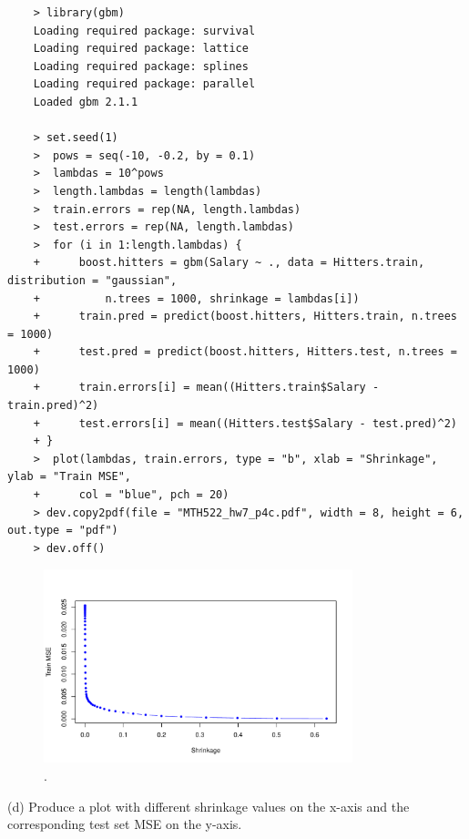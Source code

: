 \documentclass{article}
\begin{document}
\begin{program}
	\begin{verbatim}
	> library(gbm)
	Loading required package: survival
	Loading required package: lattice
	Loading required package: splines
	Loading required package: parallel
	Loaded gbm 2.1.1
	
	> set.seed(1)
	>  pows = seq(-10, -0.2, by = 0.1)
	>  lambdas = 10^pows
	>  length.lambdas = length(lambdas)
	>  train.errors = rep(NA, length.lambdas)
	>  test.errors = rep(NA, length.lambdas)
	>  for (i in 1:length.lambdas) {
	+      boost.hitters = gbm(Salary ~ ., data = Hitters.train, distribution = "gaussian",
	+          n.trees = 1000, shrinkage = lambdas[i])
	+      train.pred = predict(boost.hitters, Hitters.train, n.trees = 1000)
	+      test.pred = predict(boost.hitters, Hitters.test, n.trees = 1000)
	+      train.errors[i] = mean((Hitters.train$Salary - train.pred)^2)
	+      test.errors[i] = mean((Hitters.test$Salary - test.pred)^2)
	+ }
	>  plot(lambdas, train.errors, type = "b", xlab = "Shrinkage", ylab = "Train MSE",
	+      col = "blue", pch = 20)
	> dev.copy2pdf(file = "MTH522_hw7_p4c.pdf", width = 8, height = 6, out.type = "pdf")
	> dev.off() 
	\end{verbatim}
\end{program}


\begin{figure}[htb]
	\begin{center}
		\includegraphics[width=0.8\textwidth]{MTH522_hw7_p4c.pdf}
	\end{center}
	\caption{.}
	\label{fig:MTH522_hw7_p4c}
\end{figure}

\newpage


(d) Produce a plot with different shrinkage values on the x-axis and the corresponding test set MSE on the y-axis. \\
\end{document}
